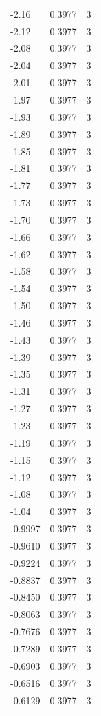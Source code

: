 \begin{longtable}{lrr}
  -2.16 & 0.3977 & 3 \\
  -2.12 & 0.3977 & 3 \\
  -2.08 & 0.3977 & 3 \\
  -2.04 & 0.3977 & 3 \\
  -2.01 & 0.3977 & 3 \\
  -1.97 & 0.3977 & 3 \\
  -1.93 & 0.3977 & 3 \\
  -1.89 & 0.3977 & 3 \\
  -1.85 & 0.3977 & 3 \\
  -1.81 & 0.3977 & 3 \\
  -1.77 & 0.3977 & 3 \\
  -1.73 & 0.3977 & 3 \\
  -1.70 & 0.3977 & 3 \\
  -1.66 & 0.3977 & 3 \\
  -1.62 & 0.3977 & 3 \\
  -1.58 & 0.3977 & 3 \\
  -1.54 & 0.3977 & 3 \\
  -1.50 & 0.3977 & 3 \\
  -1.46 & 0.3977 & 3 \\
  -1.43 & 0.3977 & 3 \\
  -1.39 & 0.3977 & 3 \\
  -1.35 & 0.3977 & 3 \\
  -1.31 & 0.3977 & 3 \\
  -1.27 & 0.3977 & 3 \\
  -1.23 & 0.3977 & 3 \\
  -1.19 & 0.3977 & 3 \\
  -1.15 & 0.3977 & 3 \\
  -1.12 & 0.3977 & 3 \\
  -1.08 & 0.3977 & 3 \\
  -1.04 & 0.3977 & 3 \\
  -0.9997 & 0.3977 & 3 \\
  -0.9610 & 0.3977 & 3 \\
  -0.9224 & 0.3977 & 3 \\
  -0.8837 & 0.3977 & 3 \\
  -0.8450 & 0.3977 & 3 \\
  -0.8063 & 0.3977 & 3 \\
  -0.7676 & 0.3977 & 3 \\
  -0.7289 & 0.3977 & 3 \\
  -0.6903 & 0.3977 & 3 \\
  -0.6516 & 0.3977 & 3 \\
  -0.6129 & 0.3977 & 3 \\

\end{longtable}
